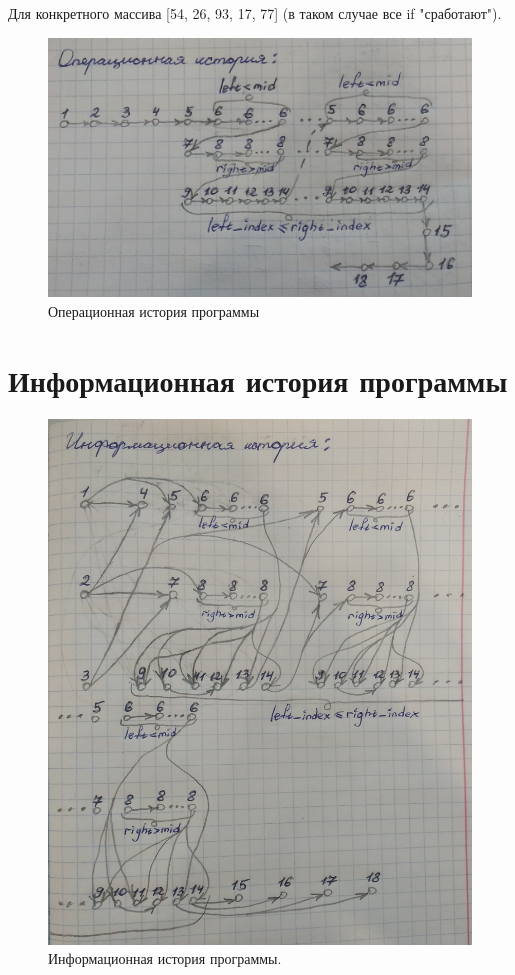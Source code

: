 \documentclass[12pt]{report}
\begin{document}
	Для конкретного массива [54, 26, 93, 17, 77] (в таком случае все if "сработают").
	
	\begin{figure}[h]
		\centering
		\includegraphics[scale=0.2]{oper_history.jpg}
		\caption{Операционная история программы}
		\label{fig:mpr}
	\end{figure}

	\newpage
	
	\section{Информационная история программы}
	
	\begin{figure}[h]
		\centering
		\includegraphics[scale=0.145]{inform_history.jpg}
		\caption{Информационная история программы.}
		\label{fig:mpr}
	\end{figure}
\end{document}
